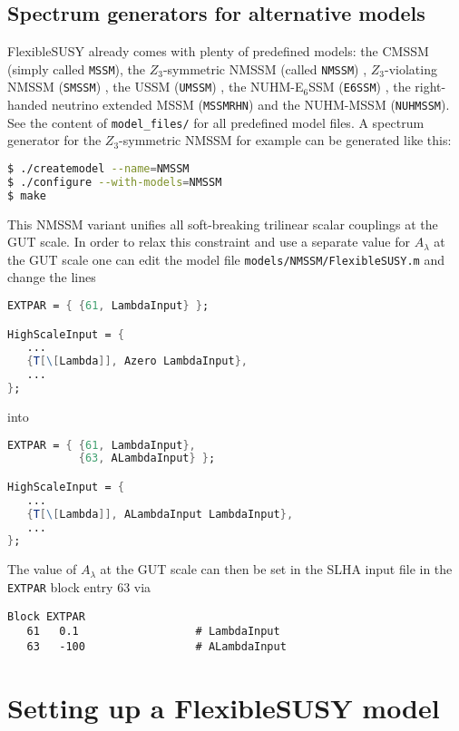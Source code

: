 \documentclass[final,3p,11pt,pdflatex]{elsarticle}
\makeatletter
\newcommand{\fs}{FlexibleSUSY\@\xspace}
\newcommand{\ESSM}{E$_6$SSM\@\xspace}
\newcommand{\code}[1]{\lstinline|#1|}  %
\makeatother
\begin{document}
\subsection{Spectrum generators for alternative models}

\fs already comes with plenty of predefined models: the CMSSM (simply
called \code{MSSM}), the $Z_3$-symmetric NMSSM (called \code{NMSSM})
\cite{Ellwanger:2009dp}, $Z_3$-violating NMSSM (\code{SMSSM})
\cite{Ellwanger:2009dp}, the USSM (\code{UMSSM})
\cite{Fayet:1977yc,Cvetic:1997ky,Erler:2002pr}, the NUHM-\ESSM
(\code{E6SSM}) \cite{King:2005jy,Athron:2007en}, the right-handed
neutrino extended MSSM (\code{MSSMRHN}) and the NUHM-MSSM
(\code{NUHMSSM}).  See the content of \code{model_files/} for all
predefined model files.  A spectrum generator for the $Z_3$-symmetric
NMSSM for example can be generated like this:
%
\begin{lstlisting}[language=bash]
$ ./createmodel --name=NMSSM
$ ./configure --with-models=NMSSM
$ make
\end{lstlisting}%
%
This NMSSM variant unifies all soft-breaking trilinear scalar
couplings at the GUT scale.  In order to relax this constraint and use
a separate value for $A_\lambda$ at the GUT scale one can edit the
model file \code{models/NMSSM/FlexibleSUSY.m} and change the lines
%
\begin{lstlisting}[language=Mathematica]
EXTPAR = { {61, LambdaInput} };

HighScaleInput = {
   ...
   {T[\[Lambda]], Azero LambdaInput},
   ...
};
\end{lstlisting}
%
into
%
\begin{lstlisting}[language=Mathematica]
EXTPAR = { {61, LambdaInput},
           {63, ALambdaInput} };

HighScaleInput = {
   ...
   {T[\[Lambda]], ALambdaInput LambdaInput},
   ...
};
\end{lstlisting}
%
The value of $A_\lambda$ at the GUT scale can then be set in the SLHA
input file in the \code{EXTPAR} block entry $63$ via
%
\begin{lstlisting}
Block EXTPAR
   61   0.1                  # LambdaInput
   63   -100                 # ALambdaInput
\end{lstlisting}

\section{Setting up a FlexibleSUSY model}
\label{sec:modfile}
\end{document}

